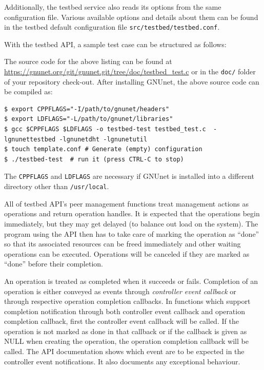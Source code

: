 \documentclass[10pt]{article}
\begin{document}
Additionally, the testbed service also reads its options from the same
configuration file.  Various available options and details about them can be
found in the testbed default configuration file \texttt{src/testbed/testbed.conf}.

With the testbed API, a sample test case can be structured as follows:
\lstset{language=C}

The source code for the above listing can be found at
\url{https://gnunet.org/git/gnunet.git/tree/doc/testbed_test.c}
or in the {\tt doc/} folder of your repository check-out.
After installing GNUnet, the above source code can be compiled as:
\lstset{language=bash}
\begin{lstlisting}
$ export CPPFLAGS="-I/path/to/gnunet/headers"
$ export LDFLAGS="-L/path/to/gnunet/libraries"
$ gcc $CPPFLAGS $LDFLAGS -o testbed-test testbed_test.c  -lgnunettestbed -lgnunetdht -lgnunetutil
$ touch template.conf # Generate (empty) configuration
$ ./testbed-test  # run it (press CTRL-C to stop)
\end{lstlisting}
The \texttt{CPPFLAGS} and \texttt{LDFLAGS} are necessary if GNUnet is installed
into a different directory other than \texttt{/usr/local}.

All of testbed API's peer management functions treat management actions as
operations and return operation handles.  It is expected that the operations
begin immediately, but they may get delayed (to balance out load on the system).
The program using the API then has to take care of marking the operation as
``done'' so that its associated resources can be freed immediately and other
waiting operations can be executed.  Operations will be canceled if they are
marked as ``done'' before their completion.

An operation is treated as completed when it succeeds or fails.  Completion of
an operation is either conveyed as events through \textit{controller event
  callback} or through respective operation completion callbacks.  In functions
which support completion notification through both controller event callback and
operation completion callback, first the controller event callback will be
called.  If the operation is not marked as done in that callback or if the
callback is given as NULL when creating the operation, the operation completion
callback will be called.  The API documentation shows which event are to be
expected in the controller event notifications.  It also documents any
exceptional behaviour.
\end{document}
